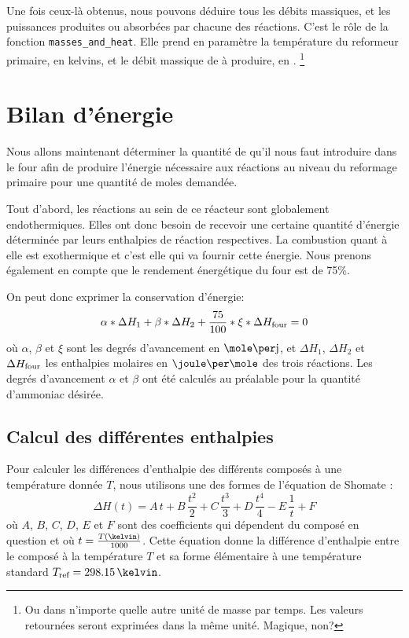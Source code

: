 Une fois ceux-là obtenus, nous pouvons déduire tous
les débits massiques,
et les puissances produites ou absorbées par chacune des réactions.
C'est le rôle de la fonction \texttt{masses\_and\_heat}.
Elle prend en paramètre la température du reformeur primaire, en kelvins,
et le débit massique de  à produire, en \kilogram\per\second.%
\footnote{Ou dans n'importe quelle autre unité de masse par temps.
Les valeurs retournées seront exprimées dans la même unité. Magique, non?}

\section{Bilan d'énergie}

Nous allons maintenant déterminer la quantité de  qu’il nous faut introduire
dans le four afin de produire l’énergie nécessaire aux réactions
au niveau du reformage primaire pour une quantité de moles demandée.

Tout d’abord, les réactions au sein de ce réacteur sont globalement endothermiques.
Elles ont donc besoin de recevoir une certaine quantité d’énergie
déterminée par leurs enthalpies de réaction respectives.
La combustion quant à elle est exothermique et c’est elle qui va fournir cette énergie.
Nous prenons également en compte que le rendement énergétique du four est de 75\%.

On peut donc exprimer la conservation d'énergie:
$$\alpha*\Delta H_1 + \beta*\Delta H_2 + \frac{75}{100}*\xi*\Delta H_{\mbox{\scriptsize{four}}} = 0$$
où $\alpha$, $\beta$ et $\xi$ sont les degrés d'avancement en $\mole\per\jour$,
et $\Delta H_1$, $\Delta H_2$ et $\Delta H_{\mbox{\scriptsize{four}}}$ les enthalpies molaires en
$\joule\per\mole$ des trois réactions.
Les degrés d'avancement $\alpha$ et $\beta$ ont été calculés
au préalable pour la quantité d’ammoniac désirée.

\subsection{Calcul des différentes enthalpies}

Pour calculer les différences d'enthalpie des différents composés
à une température donnée $T$,
nous utilisons une des formes de l'équation de Shomate \cite{nist}:
$$\Delta H(t) = A\,t + B\,\frac{t^2}{2} + C\,\frac{t^3}{3}
+ D\,\frac{t^4}{4} - E\,\frac{1}{t} + F$$
où $A$, $B$, $C$, $D$, $E$ et $F$ sont des coefficients
qui dépendent du composé en question et où $t=\frac{T(\kelvin)}{1000}$.
Cette équation donne la différence d'enthalpie entre le composé à la température $T$
et sa forme élémentaire à une température standard $T\ind{ref} = 298.15\,\kelvin$.

